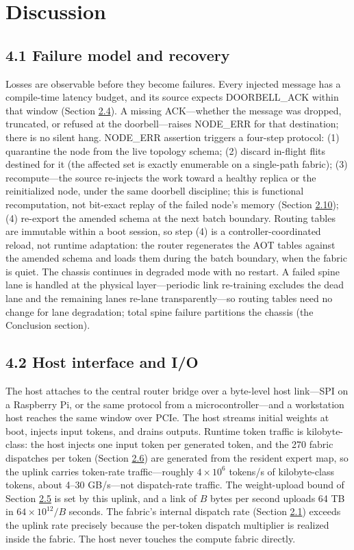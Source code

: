 \documentclass[10pt,twocolumn]{article}
\begin{document}
\section*{Discussion}\label{sec:discussion}

\subsection*{4.1 Failure model and recovery}\label{sec:4.1}

Losses are observable before they become failures. Every injected message has a compile-time latency budget, and its source expects DOORBELL\_ACK within that window (Section \hyperref[sec:2.4]{2.4}). A missing ACK---whether the message was dropped, truncated, or refused at the doorbell---raises NODE\_ERR for that destination; there is no silent hang. NODE\_ERR assertion triggers a four-step protocol: (1) quarantine the node from the live topology schema; (2) discard in-flight flits destined for it (the affected set is exactly enumerable on a single-path fabric); (3) recompute---the source re-injects the work toward a healthy replica or the reinitialized node, under the same doorbell discipline; this is functional recomputation, not bit-exact replay of the failed node's memory (Section \hyperref[sec:2.10]{2.10}); (4) re-export the amended schema at the next batch boundary. Routing tables are immutable within a boot session, so step (4) is a controller-coordinated reload, not runtime adaptation: the router regenerates the AOT tables against the amended schema and loads them during the batch boundary, when the fabric is quiet. The chassis continues in degraded mode with no restart. A failed spine lane is handled at the physical layer---periodic link re-training excludes the dead lane and the remaining lanes re-lane transparently---so routing tables need no change for lane degradation; total spine failure partitions the chassis (the Conclusion section).

\subsection*{4.2 Host interface and I/O}\label{sec:4.2}

The host attaches to the central router bridge over a byte-level host link---SPI on a Raspberry Pi, or the same protocol from a microcontroller---and a workstation host reaches the same window over PCIe. The host streams initial weights at boot, injects input tokens, and drains outputs. Runtime token traffic is kilobyte-class: the host injects one input token per generated token, and the 270 fabric dispatches per token (Section \hyperref[sec:2.6]{2.6}) are generated from the resident expert map, so the uplink carries token-rate traffic---roughly $4\times10^{6}$ tokens/s of kilobyte-class tokens, about 4--30 GB/s---not dispatch-rate traffic. The weight-upload bound of Section \hyperref[sec:2.5]{2.5} is set by this uplink, and a link of $B$ bytes per second uploads 64 TB in $64\times10^{12}/B$ seconds. The fabric's internal dispatch rate (Section \hyperref[sec:2.1]{2.1}) exceeds the uplink rate precisely because the per-token dispatch multiplier is realized inside the fabric. The host never touches the compute fabric directly.
\end{document}
